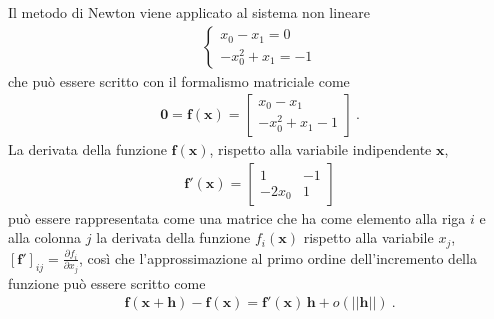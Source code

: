 \documentclass[letterpaper,10pt,english]{jupyterBook}
\begin{document}
\sphinxAtStartPar
{} Il metodo di Newton viene applicato al sistema non lineare
\begin{equation*}
\begin{split}\begin{cases}
    x_0   - x_1 = 0 \\
  - x_0^2 + x_1 = -1
\end{cases}\end{split}
\end{equation*}
\sphinxAtStartPar
che può essere scritto con il formalismo matriciale come
\begin{equation*}
\begin{split}\mathbf{0} = \mathbf{f}(\mathbf{x}) = \begin{bmatrix} x_0 - x_1 \\ -x_0^2 + x_1 - 1 \end{bmatrix} \ .\end{split}
\end{equation*}
\sphinxAtStartPar
La derivata della funzione \(\mathbf{f}(\mathbf{x})\), rispetto alla variabile indipendente \(\mathbf{x}\),
\begin{equation*}
\begin{split}\mathbf{f}'(\mathbf{x}) = \begin{bmatrix} 1 & - 1 \\ - 2 x_0 & 1\end{bmatrix}\end{split}
\end{equation*}
\sphinxAtStartPar
può essere rappresentata come una matrice che ha come elemento alla riga \(i\) e alla colonna \(j\) la derivata della funzione \(f_i(\mathbf{x})\) rispetto alla variabile \(x_j\), \(\left[ \mathbf{f}' \right]_{ij} = \frac{\partial f_i}{\partial x_j}\), così che l’approssimazione al primo ordine dell’incremento della funzione può essere scritto come
\begin{equation*}
\begin{split}\mathbf{f}(\mathbf{x}+\mathbf{h}) - \mathbf{f}(\mathbf{x}) = \mathbf{f}'(\mathbf{x}) \, \mathbf{h} + o(||\mathbf{h}||) \ .\end{split}
\end{equation*}
\end{document}
